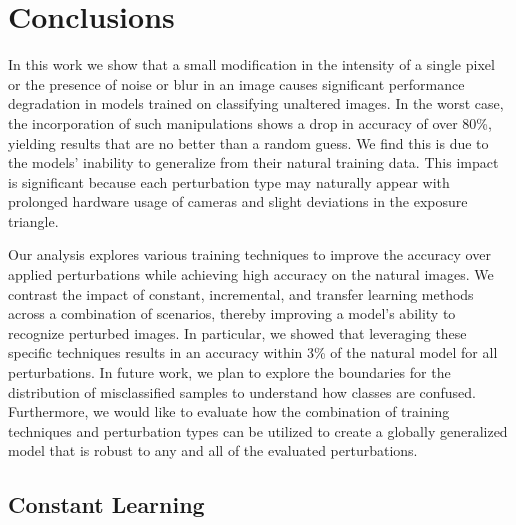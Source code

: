 \documentclass[conference]{IEEEtran}
\begin{document}
\section{Conclusions}

In this work we show that a small modification in the intensity of a single pixel or the presence of noise or blur in an image causes significant performance degradation in models trained on classifying unaltered images. In the worst case, the incorporation of such manipulations shows a drop in accuracy of over 80\%, yielding results that are no better than a random guess. We find this is due to the models' inability to generalize from their natural training data. This impact is significant because each perturbation type may naturally appear with prolonged hardware usage of cameras and slight deviations in the exposure triangle. 

Our analysis explores various training techniques to improve the accuracy over applied perturbations while achieving high accuracy on the natural images. We contrast the impact of constant, incremental, and transfer learning methods across a combination of scenarios, thereby improving a model’s ability to recognize perturbed images. In particular, we showed that leveraging these specific techniques results in an accuracy within 3\% of the natural model for all perturbations. In future work, we plan to explore the boundaries for the distribution of misclassified samples to understand how classes are confused. Furthermore, we would like to evaluate how the combination of training techniques and perturbation types can be utilized to create a globally generalized model that is robust to any and all of the evaluated perturbations.





\newpage
\onecolumn
\appendix

\setcounter{figure}{0}

\subsection{Constant Learning}
\end{document}
